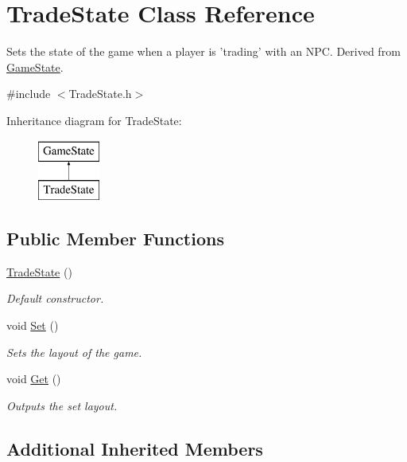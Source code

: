 \hypertarget{classTradeState}{\section{Trade\-State Class Reference}
\label{classTradeState}
}


Sets the state of the game when a player is 'trading' with an N\-P\-C. Derived from \hyperlink{classGameState}{Game\-State}.  




{\ttfamily \#include $<$Trade\-State.\-h$>$}

Inheritance diagram for Trade\-State\-:\begin{figure}[H]
\begin{center}
\leavevmode
\includegraphics[height=2.000000cm]{classTradeState}
\end{center}
\end{figure}
\subsection*{Public Member Functions}
\begin{DoxyCompactItemize}
\item 
\hyperlink{classTradeState_a1778870265717d50054d29be886b27d4}{Trade\-State} ()
\begin{DoxyCompactList}\small\item\em Default constructor. \end{DoxyCompactList}\item 
void \hyperlink{classTradeState_af0d9fdcd649c1e74620dc77a4b8f92f9}{Set} ()
\begin{DoxyCompactList}\small\item\em Sets the layout of the game. \end{DoxyCompactList}\item 
void \hyperlink{classTradeState_a6479e704b1063281721200a0beac6bc1}{Get} ()
\begin{DoxyCompactList}\small\item\em Outputs the set layout. \end{DoxyCompactList}\end{DoxyCompactItemize}
\subsection*{Additional Inherited Members}


